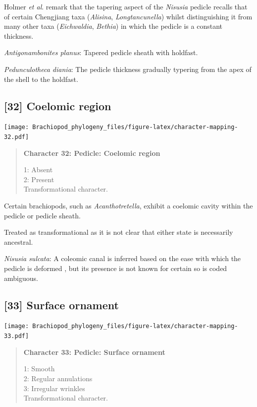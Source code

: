\documentclass[openany]{book}
\begin{document}
Holmer \emph{et al}. \citeyearpar{Holmer2018Theattachment} remark that
the tapering aspect of the \emph{Nisusia} pedicle recalls that of
certain Chengjiang taxa (\emph{Alisina}, \emph{Longtancunella}) whilst
distinguishing it from many other taxa (\emph{Eichwaldia},
\emph{Bethia}) in which the pedicle is a constant thickness.

\hypertarget{Antigonambonites_planus-coding-31}{}
\emph{Antigonambonites planus}: Tapered pedicle sheath with holdfast.

\hypertarget{Pedunculotheca_diania-coding-31}{}
\emph{Pedunculotheca diania}: The pedicle thickness gradually typering
from the apex of the shell to the holdfast.

\subsection*{{[}32{]} Coelomic region}\label{coelomic-region}

\texttt{[image: Brachiopod\_phylogeny\_files/figure-latex/character-mapping-32.pdf]}

\begin{quote}
\textbf{Character 32: Pedicle: Coelomic region}

1: Absent\\
2: Present\\
Transformational character.
\end{quote}

Certain brachiopods, such as \emph{Acanthotretella}, exhibit a coelomic
cavity within the pedicle or pedicle sheath.

Treated as transformational as it is not clear that either state is
necessarily ancestral.

\hypertarget{Nisusia_sulcata-coding-32}{}
\emph{Nisusia sulcata}: A coleomic canal is inferred based on the ease
with which the pedicle is deformed
\citep{Holmer2018Evolutionarysignificance}, but its presence is not
known for certain so is coded ambiguous.

\subsection*{{[}33{]} Surface ornament}\label{surface-ornament-1}

\texttt{[image: Brachiopod\_phylogeny\_files/figure-latex/character-mapping-33.pdf]}

\begin{quote}
\textbf{Character 33: Pedicle: Surface ornament}

1: Smooth\\
2: Regular annulations\\
3: Irregular wrinkles\\
Transformational character.
\end{quote}
\end{document}
